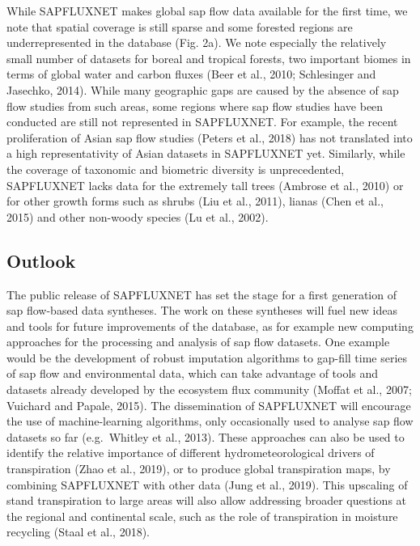 \documentclass[11pt,twoside]{reedthesis}
\begin{document}
While SAPFLUXNET makes global sap flow data available for the first
time, we note that spatial coverage is still sparse and some forested
regions are underrepresented in the database (Fig. 2a). We note
especially the relatively small number of datasets for boreal and
tropical forests, two important biomes in terms of global water and
carbon fluxes (Beer et al., 2010; Schlesinger and Jasechko, 2014). While
many geographic gaps are caused by the absence of sap flow studies from
such areas, some regions where sap flow studies have been conducted are
still not represented in SAPFLUXNET. For example, the recent
proliferation of Asian sap flow studies (Peters et al., 2018) has not
translated into a high representativity of Asian datasets in SAPFLUXNET
yet. Similarly, while the coverage of taxonomic and biometric diversity
is unprecedented, SAPFLUXNET lacks data for the extremely tall trees
(Ambrose et al., 2010) or for other growth forms such as shrubs (Liu et
al., 2011), lianas (Chen et al., 2015) and other non-woody species (Lu
et al., 2002).\par

\subsection{Outlook}\label{outlook}

The public release of SAPFLUXNET has set the stage for a first
generation of sap flow-based data syntheses. The work on these syntheses
will fuel new ideas and tools for future improvements of the database,
as for example new computing approaches for the processing and analysis
of sap flow datasets. One example would be the development of robust
imputation algorithms to gap-fill time series of sap flow and
environmental data, which can take advantage of tools and datasets
already developed by the ecosystem flux community (Moffat et al., 2007;
Vuichard and Papale, 2015). The dissemination of SAPFLUXNET will
encourage the use of machine-learning algorithms, only occasionally used
to analyse sap flow datasets so far (e.g.~Whitley et al., 2013). These
approaches can also be used to identify the relative importance of
different hydrometeorological drivers of transpiration (Zhao et al.,
2019), or to produce global transpiration maps, by combining SAPFLUXNET
with other data (Jung et al., 2019). This upscaling of stand
transpiration to large areas will also allow addressing broader
questions at the regional and continental scale, such as the role of
transpiration in moisture recycling (Staal et al., 2018).\par
\end{document}
